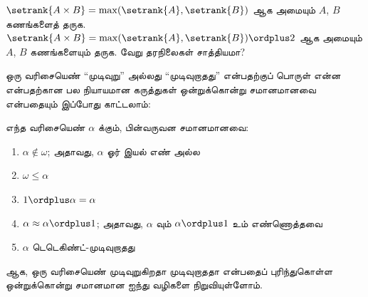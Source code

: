 \documentclass[../../../include/open-logic-section]{subfiles}
\begin{document}
\begin{prob}
$\setrank{A \times B} =
\max(\setrank{A}, \setrank{B})$ ஆக அமையும் $A$, $B$ கணங்களைத்
தருக. $\setrank{A \times B} =
\max(\setrank{A}, \setrank{B}) \ordplus  2$ ஆக அமையும் $A$,
$B$ கணங்களையும் தருக. வேறு தரநிலைகள் சாத்தியமா?
\end{prob}

ஒரு வரிசையெண் ``முடிவுறு'' அல்லது ``முடிவுறாதது'' என்பதற்குப்
பொருள் என்ன என்பதற்கான பல நியாயமான கருத்துகள் ஒன்றுக்கொன்று
சமானமானவை என்பதையும் இப்போது காட்டலாம்:

\begin{lem}
எந்த வரிசையெண் $\alpha$ க்கும், பின்வருவன சமானமானவை:
\begin{enumerate}
  \item{} $\alpha\notin \omega$;
  அதாவது, $\alpha$ ஓர் இயல் எண் அல்ல
  \item{} $\omega \leq \alpha$
  \item{} $1 \ordplus  \alpha = \alpha$
  \item{} $\alpha \approx \alpha\ordplus 1$;
  அதாவது, $\alpha$ வும் $\alpha\ordplus 1$ உம் எண்ணொத்தவை
  \item{} $\alpha$ டெடெகிண்ட்-முடிவுறாதது
\end{enumerate}
\end{lem}
\noindent

ஆக, ஒரு வரிசையெண் முடிவுறுகிறதா முடிவுறாததா என்பதைப் புரிந்துகொள்ள
ஒன்றுக்கொன்று சமானமான ஐந்து வழிகளை நிறுவியுள்ளோம்.
\end{document}
